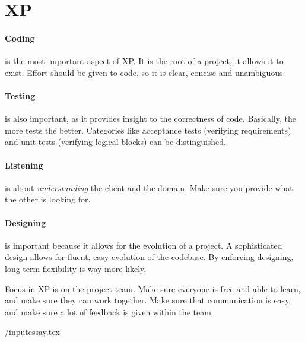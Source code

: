 \documentclass[]{uva-bachelor-thesis}
\def \CurrChapter {}
\def \CurrSection {}
\renewcommand{\chaptermark}[1]{\def \CurrChapter {#1} \def \CurrSection {}}
\begin{document}
\section{XP}
\paragraph{Coding} is the most important aspect of XP. 
It is the root of a project, it allows it to exist. 
Effort should be given to code, so it is clear, concise and unambiguous. 

\paragraph{Testing} is also important, as it provides insight to the correctness of code. 
Basically, the more tests the better. 
Categories like acceptance tests (verifying requirements) and unit tests (verifying logical blocks) can be distinguished.

\paragraph{Listening} is about \emph{understanding} the client and the domain. 
Make sure you provide what the other is looking for.

\paragraph{Designing} is important because it allows for the evolution of a project. 
A sophisticated design allows for fluent, easy evolution of the codebase. 
By enforcing designing, long term flexibility is way more likely.

Focus in XP is on the project team. 
Make sure everyone is free and able to learn, and make sure they can work together. 
Make sure that communication is easy, and make sure a lot of feedback is given within the team.

/input{essay.tex}


%
%
\end{document}
